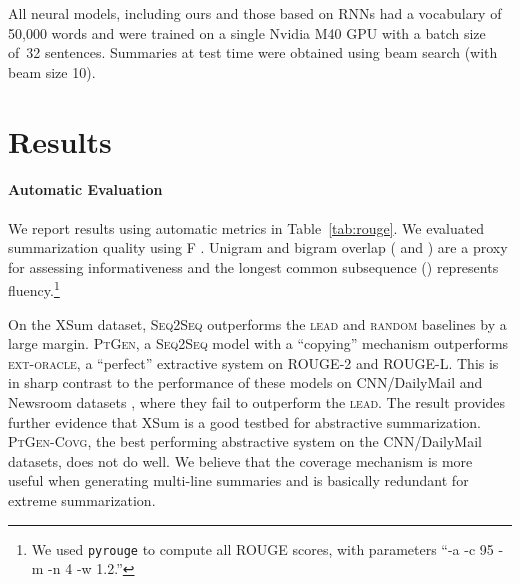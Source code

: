\documentclass[11pt,a4paper]{article}
\begin{document}
All neural models, including ours and those based on RNNs \cite{see-acl17}
had a vocabulary of 50,000 words and were trained on a single Nvidia
M40 GPU with a batch size of~32 sentences.  Summaries at test time
were obtained using beam search (with beam size 10).

\section{Results}
\label{sec:results}


\paragraph{Automatic Evaluation} 

We report results using automatic metrics in Table~\ref{tab:rouge}.
We evaluated summarization quality using F 
\cite{rouge}. Unigram and bigram overlap ( and
) are a proxy for assessing informativeness and the
longest common subsequence () represents
fluency.\footnote{We used \texttt{pyrouge} to compute all ROUGE
  scores, with parameters ``-a -c 95 -m -n 4 -w 1.2.''}



On the XSum dataset, \textsc{Seq2Seq} outperforms the \textsc{lead}
and \textsc{random} baselines by a large margin. \textsc{PtGen}, a
\textsc{Seq2Seq} model with a ``copying'' mechanism outperforms
\textsc{ext-oracle}, a ``perfect'' extractive system on ROUGE-2 and
ROUGE-L. This is in sharp contrast to the performance of these models
on CNN/DailyMail \cite{see-acl17} and  Newsroom datasets
\cite{newsroom-naacl18}, where they fail to outperform the
\textsc{lead}. The result provides further evidence that XSum is a
good testbed for abstractive summarization. \textsc{PtGen-Covg}, the
best performing abstractive system on the CNN/DailyMail datasets, does
not do well.  We believe that the coverage mechanism is more useful
when generating multi-line summaries and is basically redundant for
extreme summarization. 
\end{document}
